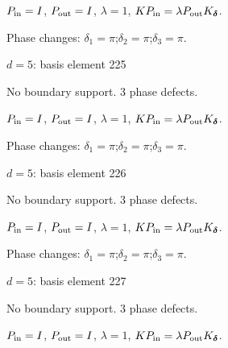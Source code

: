 \vspace{-1mm}
$P_{\rm in}=I$, \quad $P_{\rm out}=I$, \quad $\lambda=1$, \qquad $K P_{\rm in}=\lambda P_{\rm out}K_{\boldsymbol\delta}$.
\par\smallskip\begin{minipage}{.98\linewidth}\small Phase changes: $\delta_{1}=\pi$;\quad $\delta_{2}=\pi$;\quad $\delta_{3}=\pi$.\end{minipage}
\vfill
{\footnotesize\texttt{}}
\newpage
{}
{\Large $d=5$: basis element 225}\par
No boundary support. 3 phase defects.
\begin{center}
\end{center}
\vspace{-1mm}
$P_{\rm in}=I$, \quad $P_{\rm out}=I$, \quad $\lambda=1$, \qquad $K P_{\rm in}=\lambda P_{\rm out}K_{\boldsymbol\delta}$.
\par\smallskip\begin{minipage}{.98\linewidth}\small Phase changes: $\delta_{1}=\pi$;\quad $\delta_{2}=\pi$;\quad $\delta_{3}=\pi$.\end{minipage}
\vfill
{\footnotesize\texttt{}}
\newpage
{}
{\Large $d=5$: basis element 226}\par
No boundary support. 3 phase defects.
\begin{center}
\end{center}
\vspace{-1mm}
$P_{\rm in}=I$, \quad $P_{\rm out}=I$, \quad $\lambda=1$, \qquad $K P_{\rm in}=\lambda P_{\rm out}K_{\boldsymbol\delta}$.
\par\smallskip\begin{minipage}{.98\linewidth}\small Phase changes: $\delta_{1}=\pi$;\quad $\delta_{2}=\pi$;\quad $\delta_{3}=\pi$.\end{minipage}
\vfill
{\footnotesize\texttt{}}
\newpage
{}
{\Large $d=5$: basis element 227}\par
No boundary support. 3 phase defects.
\begin{center}
\end{center}
\vspace{-1mm}
$P_{\rm in}=I$, \quad $P_{\rm out}=I$, \quad $\lambda=1$, \qquad $K P_{\rm in}=\lambda P_{\rm out}K_{\boldsymbol\delta}$.
